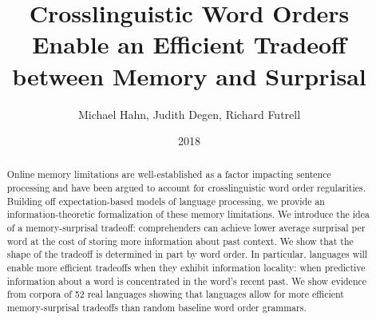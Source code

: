 \documentclass[11pt,letterpaper]{article}
\title{Crosslinguistic Word Orders Enable an Efficient Tradeoff between Memory and Surprisal}
\author{Michael Hahn, Judith Degen, Richard Futrell}
\date{2018}
\newcounter{theorem}
\newtheorem{thm}[theorem]{Theorem}
\begin{document}
\maketitle


%
\begin{abstract}

Online memory limitations are well-established as a factor impacting sentence processing and have been argued to account for crosslinguistic word order regularities. Building off expectation-based models of language processing, we provide an information-theoretic formalization of these memory limitations. We introduce the idea of a memory-surprisal tradeoff: comprehenders can achieve lower average surprisal per word at the cost of storing more information about past context. We show that the shape of the tradeoff is determined in part by word order. In particular, languages will enable more efficient tradeoffs when they exhibit information locality: when predictive information about a word is concentrated in the word’s recent past. We show evidence from corpora of 52 real languages showing that languages allow for more efficient memory-surprisal tradeoffs than random baseline word order grammars. 

\end{abstract}


%
%
%
\end{document}
